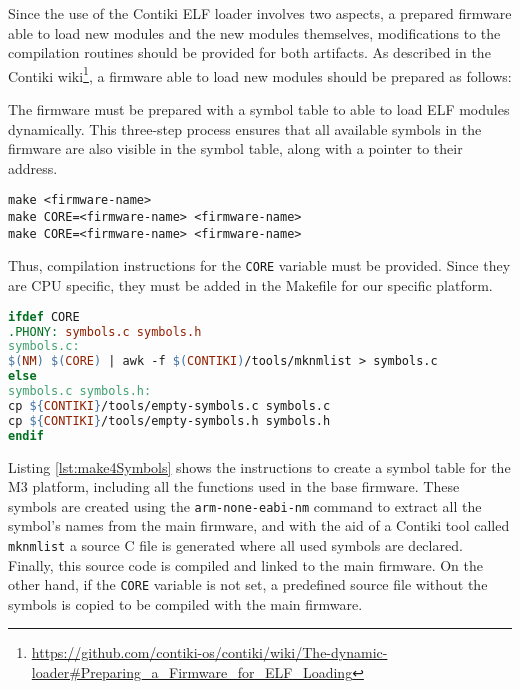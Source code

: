 Since the use of the Contiki ELF loader involves two aspects, a prepared firmware able to load new modules and the new modules themselves, modifications to the compilation routines should be provided for both artifacts.
As described in the Contiki wiki\footnote{\url{https://github.com/contiki-os/contiki/wiki/The-dynamic-loader\#Preparing_a_Firmware_for_ELF_Loading}}, a firmware able to load new modules should be prepared as follows:
\begin{citeverbatim}
	The firmware must be prepared with a symbol table to able to load ELF modules dynamically.
	This three-step process ensures that all available symbols in the firmware are also visible in the symbol table, along with a pointer to their address.
	
	\texttt{make <firmware-name>} \\
	\texttt{make CORE=<firmware-name> <firmware-name>} \\
	\texttt{make CORE=<firmware-name> <firmware-name>} \\
\end{citeverbatim}
Thus, compilation instructions for the \texttt{CORE} variable must be provided.
Since they are CPU specific, they must be added in the Makefile for our specific platform.
\\
\begin{lstlisting}[language=make, caption=Compilation settings to create a proper symbol table, label=lst:make4Symbols]
ifdef CORE
.PHONY: symbols.c symbols.h
symbols.c:
$(NM) $(CORE) | awk -f $(CONTIKI)/tools/mknmlist > symbols.c
else
symbols.c symbols.h:
cp ${CONTIKI}/tools/empty-symbols.c symbols.c
cp ${CONTIKI}/tools/empty-symbols.h symbols.h
endif
\end{lstlisting}

Listing \ref{lst:make4Symbols} shows the instructions to create a symbol table for the M3 platform, including all the functions used in the base firmware.
These symbols are created using the \texttt{arm-none-eabi-nm} command to extract all the symbol's names from the main firmware, and with the aid of a Contiki tool called \texttt{mknmlist} a source C file is generated where all used symbols are declared.
Finally, this source code is compiled and linked to the main firmware.
On the other hand, if the \texttt{CORE} variable is not set, a predefined source file without the symbols is copied to be compiled with the main firmware.

